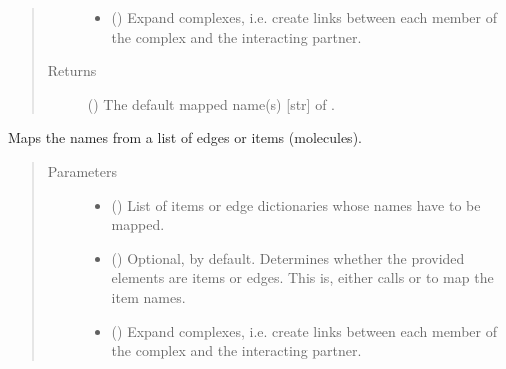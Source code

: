 \documentclass[letterpaper,10pt,english]{sphinxmanual}
\begin{document}
\begin{fulllineitems}
\begin{fulllineitems}
\begin{quote}
\begin{description}
\begin{itemize}
\item {} 
 () \textendash{} Expand complexes, i.e. create links between each member of
the complex and the interacting partner.

\end{itemize}

\item[{Returns}] \leavevmode
() \textendash{} The default mapped name(s) {[}str{]} of .

\end{description}\end{quote}

\end{fulllineitems}


\begin{fulllineitems}
\label{\detokenize{reference:pypath.main.PyPath.map_list}}
Maps the names from a list of edges or items (molecules).
\begin{quote}\begin{description}
\item[{Parameters}] \leavevmode\begin{itemize}
\item {} 
 () \textendash{} List of items or edge dictionaries whose names have to be
mapped.

\item {} 
 () \textendash{} Optional,  by default. Determines whether the
provided elements are items or edges. This is, either calls
{\hyperref[\detokenize{reference:pypath.main.PyPath.map_edge}]{}} or
{\hyperref[\detokenize{reference:pypath.main.PyPath.map_item}]{}} to map the item
names.

\item {} 
 () \textendash{} Expand complexes, i.e. create links between each member of
the complex and the interacting partner.


\end{itemize}
\end{description}
\end{quote}
\end{fulllineitems}
\end{fulllineitems}
\end{document}
